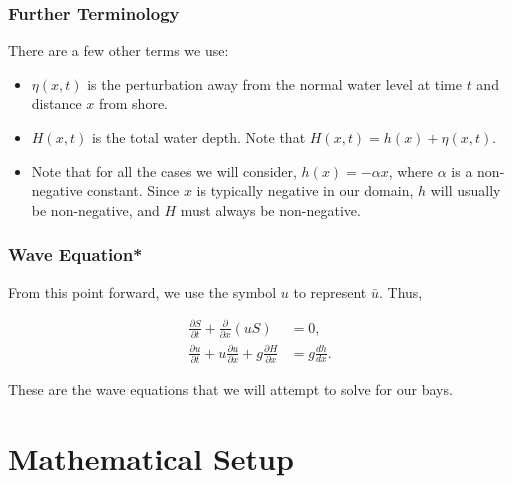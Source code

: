 	

	\begin{frame}
		\frametitle{Further Terminology}
		There are a few other terms we use:
		\begin{itemize}
			\item $\eta(x,t)$ is the perturbation away from the normal water level at time $t$ and distance $x$ from shore.
			\item $H(x,t)$ is the total water depth. Note that $H(x,t) = h(x) + \eta(x,t)$.
			\item Note that for all the cases we will consider, $h(x) = -\alpha x$, where $\alpha$ is a non-negative constant. Since $x$ is typically negative in our domain, $h$ will usually be non-negative, and $H$ must always be non-negative.
		\end{itemize}
	\end{frame}

	

	\begin{frame}
		\frametitle{Wave Equation*}
		From this point forward, we use the symbol $u$ to represent $\bar{u}$.  Thus,
		\begin{framed} \begin{align}
			\frac{\partial S}{\partial t} + \frac{\partial}{\partial x}(uS) &= 0, \label{swe1}\\
			\frac{\partial u}{\partial t} + u \frac{\partial u}{\partial x} + g \frac{\partial H}{\partial x} &= g \frac{dh}{dx}. \label{swe2}
		\end{align} \end{framed}
		These are the wave equations that we will attempt to solve for our bays.
	\end{frame}


\section{Mathematical Setup}


